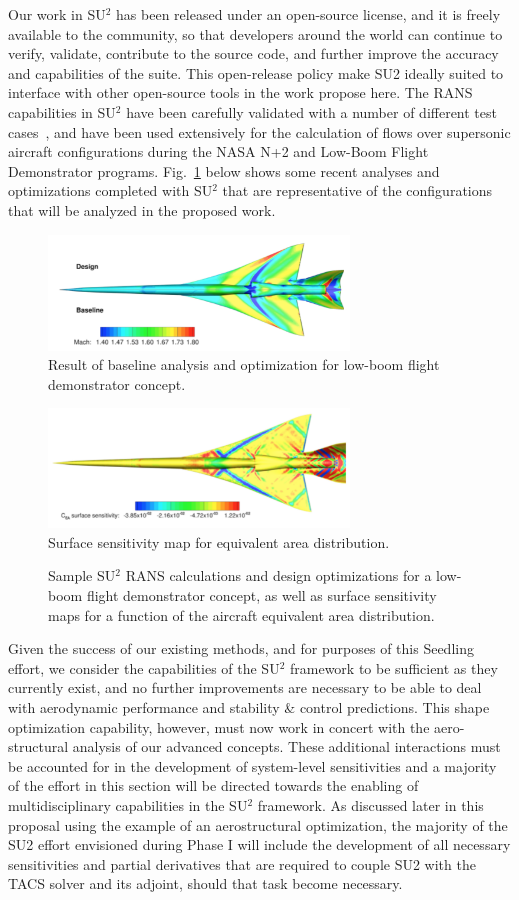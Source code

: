 \documentclass[]{aiaa-tc}
\begin{document}
Our work in SU$^2$ has been released under an open-source license, and it is freely available to the community, so that developers around the world can continue to verify, validate, contribute to the source code, and further improve the accuracy and capabilities of the suite. This open-release policy make SU2 ideally suited to interface with other open-source tools in the work propose here.  The RANS capabilities in SU$^2$ have been carefully validated with a number of different test cases~\cite{SU2:Scitech2014}, and have been used extensively for the calculation of flows over supersonic aircraft configurations during the NASA N+2 and Low-Boom Flight Demonstrator programs.  Fig.~\ref{fig:lbfd} below shows some recent analyses and optimizations completed with SU$^2$ that are representative of the configurations that will be analyzed in the proposed work.
%
\begin{figure}[h]
\parbox{\textwidth}{
\parbox{8.0cm}{\includegraphics[width=8.0cm]{images/lbfd1} \\ Result of baseline analysis and optimization for low-boom flight demonstrator concept.}\hfill\parbox{8.0cm}{\includegraphics[width=8.0cm]{images/lbfd2} \\ Surface sensitivity map for equivalent area distribution.}}
\caption{Sample SU$^2$ RANS calculations and design optimizations for a low-boom flight demonstrator concept, as well as surface sensitivity maps for a function of the aircraft equivalent area distribution.}
\label{fig:lbfd}
\end{figure}

Given the success of our existing methods, and for purposes of this Seedling effort, we consider the capabilities of the SU$^2$ framework to be sufficient as they currently exist, and no further improvements are necessary to be able to deal with aerodynamic performance and stability \& control predictions.  This shape optimization capability, however, must now work in concert with the aero-structural analysis of our advanced concepts.  These additional interactions must be accounted for in the development of system-level sensitivities and a majority of the effort in this section will be directed towards the enabling of multidisciplinary capabilities in the SU$^2$ framework.  As discussed later in this proposal using the example of an aerostructural optimization, the majority of the SU2 effort envisioned during Phase I will include the development of all necessary sensitivities and partial derivatives that are required to couple SU2 with the TACS solver and its adjoint, should that task become necessary.
\end{document}
